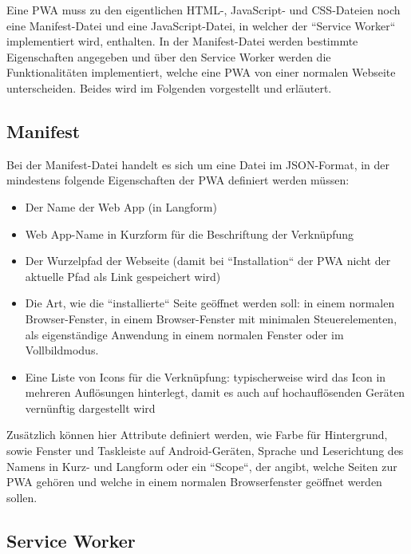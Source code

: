 Eine \acs{PWA} muss zu den eigentlichen HTML-, JavaScript- und CSS-Dateien noch eine Manifest-Datei und eine JavaScript-Datei, in welcher der ``Service Worker`` implementiert wird, enthalten. In der Manifest-Datei werden bestimmte Eigenschaften angegeben und über den Service Worker werden die Funktionalitäten implementiert, welche eine \acl{PWA} von einer normalen Webseite unterscheiden. Beides wird im Folgenden vorgestellt und erläutert.

\subsection{Manifest}
\label{sec:technologies:pwa:manifest}
Bei der Manifest-Datei handelt es sich um eine Datei im \acs{JSON}-Format, in der mindestens folgende Eigenschaften der \acs{PWA} definiert werden müssen:\cite{Manifest}

\begin{itemize}
\item Der Name der Web App (in Langform)
\item Web App-Name in Kurzform für die Beschriftung der Verknüpfung
\item Der Wurzelpfad der Webseite (damit bei ``Installation`` der \acs{PWA} nicht der aktuelle Pfad als Link gespeichert wird)
\item Die Art, wie die ``installierte`` Seite geöffnet werden soll: in einem normalen Browser-Fenster, in einem Browser-Fenster mit minimalen Steuerelementen, als eigenständige Anwendung in einem normalen Fenster oder im Vollbildmodus.
\item Eine Liste von Icons für die Verknüpfung: typischerweise wird das Icon in mehreren Auflösungen hinterlegt, damit es auch auf hochauflösenden Geräten vernünftig dargestellt wird
\end{itemize}

Zusätzlich können hier Attribute definiert werden, wie Farbe für Hintergrund, sowie Fenster und Taskleiste auf Android-Geräten, Sprache und Leserichtung des Namens in Kurz- und Langform oder ein ``Scope``, der angibt, welche Seiten zur \acl{PWA} gehören und welche in einem normalen Browserfenster geöffnet werden sollen.


\subsection{Service Worker}
\label{sec:technologies:pwa:sw}

